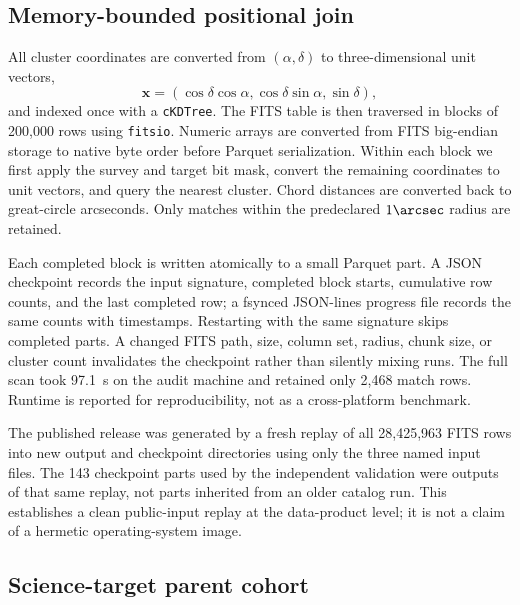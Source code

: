 \documentclass[twocolumn]{aastex701}
\begin{document}
\subsection{Memory-bounded positional join}\label{sec:join}

All cluster coordinates are converted from $(\alpha,\delta)$ to three-dimensional unit vectors,
\begin{equation}
\boldsymbol{x}=(\cos\delta\cos\alpha,\cos\delta\sin\alpha,\sin\delta),
\end{equation}
and indexed once with a \texttt{cKDTree}.  The FITS table is then traversed in blocks of 200,000
rows using \texttt{fitsio}.  Numeric arrays are converted from FITS big-endian storage to native
byte order before Parquet serialization.  Within each block we first apply the survey and target
bit mask, convert the remaining coordinates to unit vectors, and query the nearest cluster.
Chord distances are converted back to great-circle arcseconds.  Only matches within the
predeclared $1\arcsec$ radius are retained.

Each completed block is written atomically to a small Parquet part.  A JSON checkpoint records
the input signature, completed block starts, cumulative row counts, and the last completed row;
a fsynced JSON-lines progress file records the same counts with timestamps.  Restarting with the
same signature skips completed parts.  A changed FITS path, size, column set, radius, chunk size,
or cluster count invalidates the checkpoint rather than silently mixing runs.  The full scan took
97.1~s on the audit machine and retained only 2,468 match rows.  Runtime is reported for
reproducibility, not as a cross-platform benchmark.

The published release was generated by a fresh replay of all 28,425,963 FITS rows into new output
and checkpoint directories using only the three named input files.  The 143 checkpoint parts used
by the independent validation were outputs of that same replay, not parts inherited from an older
catalog run.  This establishes a clean public-input replay at the data-product level; it is not a
claim of a hermetic operating-system image.

\subsection{Science-target parent cohort}\label{sec:parent-selection}
\end{document}
